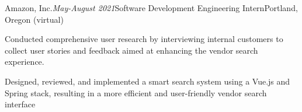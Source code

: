 \begin{rSubsection}{Amazon, Inc.}{\em May-August 2021}{Software Development Engineering Intern}{Portland, Oregon (virtual)}
\item Conducted comprehensive user research by interviewing internal customers to collect user stories and feedback aimed at enhancing the vendor search experience.
\item Designed, reviewed, and implemented a smart search system using a Vue.js and Spring stack, resulting in a more efficient and user-friendly vendor search interface
\end{rSubsection}